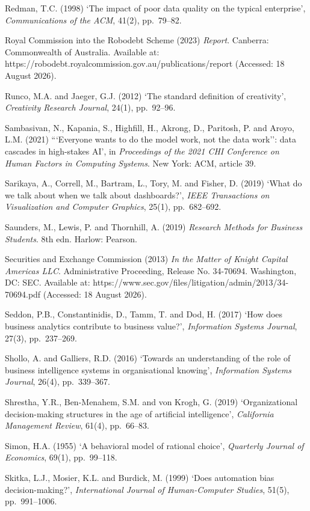 \documentclass[11pt,a4paper]{article}
\numberwithin{figure}{section}
\numberwithin{table}{section}
\newcommand{\ct}[1]{\textcolor{citeblue}{#1}}          %
\begin{document}
{Redman, T.C. (1998) `The impact of poor data quality on the typical enterprise', \emph{Communications
of the ACM}, 41(2), pp.~79--82.

Royal Commission into the Robodebt Scheme (2023) \emph{Report}. Canberra: Commonwealth of Australia.
Available at: \ct{https://robodebt.royalcommission.gov.au/publications/report} (Accessed: 18 August
2026).

Runco, M.A. and Jaeger, G.J. (2012) `The standard definition of creativity', \emph{Creativity
Research Journal}, 24(1), pp.~92--96.

Sambasivan, N., Kapania, S., Highfill, H., Akrong, D., Paritosh, P. and Aroyo, L.M. (2021)
```Everyone wants to do the model work, not the data work'': data cascades in high-stakes AI', in
\emph{Proceedings of the 2021 CHI Conference on Human Factors in Computing Systems}. New York: ACM,
article 39.

Sarikaya, A., Correll, M., Bartram, L., Tory, M. and Fisher, D. (2019) `What do we talk about when
we talk about dashboards?', \emph{IEEE Transactions on Visualization and Computer Graphics}, 25(1),
pp.~682--692.

Saunders, M., Lewis, P. and Thornhill, A. (2019) \emph{Research Methods for Business Students}. 8th
edn. Harlow: Pearson.

Securities and Exchange Commission (2013) \emph{In the Matter of Knight Capital Americas LLC}.
Administrative Proceeding, Release No. 34-70694. Washington, DC: SEC. Available at:
\ct{https://www.sec.gov/files/litigation/admin/2013/34-70694.pdf} (Accessed: 18 August 2026).

Seddon, P.B., Constantinidis, D., Tamm, T. and Dod, H. (2017) `How does business analytics
contribute to business value?', \emph{Information Systems Journal}, 27(3), pp.~237--269.

Shollo, A. and Galliers, R.D. (2016) `Towards an understanding of the role of business intelligence
systems in organisational knowing', \emph{Information Systems Journal}, 26(4), pp.~339--367.

Shrestha, Y.R., Ben-Menahem, S.M. and von Krogh, G. (2019) `Organizational decision-making
structures in the age of artificial intelligence', \emph{California Management Review}, 61(4),
pp.~66--83.

Simon, H.A. (1955) `A behavioral model of rational choice', \emph{Quarterly Journal of Economics},
69(1), pp.~99--118.

Skitka, L.J., Mosier, K.L. and Burdick, M. (1999) `Does automation bias decision-making?',
\emph{International Journal of Human-Computer Studies}, 51(5), pp.~991--1006.

}
\end{document}
